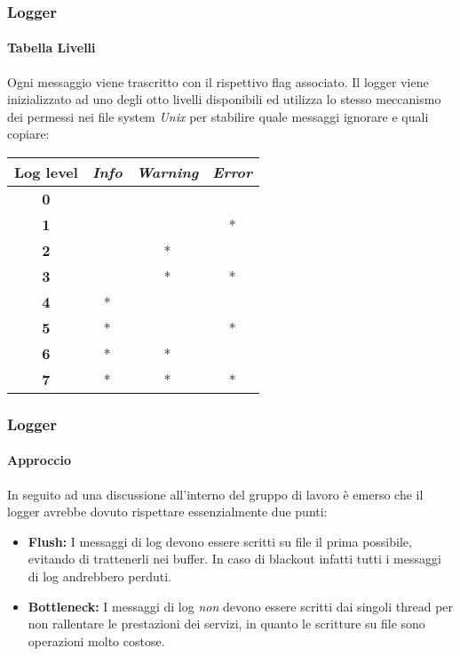 \documentclass{beamer}
\begin{document}
\begin{frame}
\frametitle{Logger}
\framesubtitle{Tabella Livelli}

Ogni messaggio viene trascritto con il rispettivo flag associato. Il logger viene
inizializzato ad uno degli otto livelli disponibili ed utilizza lo stesso meccanismo
dei permessi nei file system \textit{Unix} per stabilire quale messaggi ignorare e quali
copiare:



\begin{table}[]
\centering
\label{my-label}
\begin{tabular}{|c|c|c|c|}
\hline
\textbf{Log level} &  \textit{Info} & \textit{Warning} & \textit{Error} \\ \hline
\textbf{0}         &                &                  &                \\ \hline
\textbf{1}         &               &                  & *              \\ \hline
\textbf{2}         &               & *                &                \\ \hline
\textbf{3}         &               & *                & *              \\ \hline
\textbf{4}         & *             &                  &                \\ \hline
\textbf{5}         & *             &                  & *              \\ \hline
\textbf{6}         & *             & *                &                \\ \hline
\textbf{7}         & *             & *                & *              \\ \hline
\end{tabular}
\end{table}
\end{frame}

\begin{frame}
\frametitle{Logger}
\framesubtitle{Approccio}

In seguito ad una discussione all'interno del gruppo di lavoro è emerso che il
logger avrebbe dovuto rispettare essenzialmente due punti:

\begin{itemize}
\item \textbf{Flush:} I messaggi di log devono essere scritti su file il prima possibile,
evitando di trattenerli nei buffer. In caso di blackout infatti tutti i
messaggi di log andrebbero perduti.
\item \textbf{Bottleneck:} I messaggi di log \textit{non} devono essere scritti dai singoli thread per
non rallentare le prestazioni dei servizi, in quanto le scritture su
file sono operazioni molto costose.
\end{itemize}

\end{frame}
\end{document}
